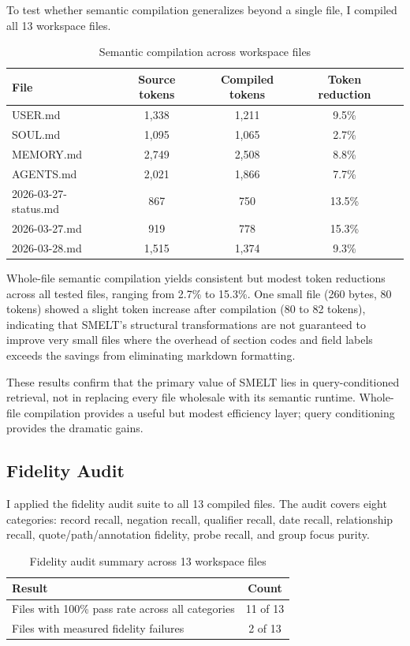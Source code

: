 \documentclass[11pt,a4paper]{article}
\begin{document}
To test whether semantic compilation generalizes beyond a single file, I compiled all 13 workspace files.

\begin{table}[H]
\centering
\caption{Semantic compilation across workspace files}
\begin{tabular}{lcccc}
\toprule
\textbf{File} & \textbf{Source tokens} & \textbf{Compiled tokens} & \textbf{Token reduction} \\
\midrule
USER.md & 1,338 & 1,211 & 9.5\% \\
SOUL.md & 1,095 & 1,065 & 2.7\% \\
MEMORY.md & 2,749 & 2,508 & 8.8\% \\
AGENTS.md & 2,021 & 1,866 & 7.7\% \\
2026-03-27-status.md & 867 & 750 & 13.5\% \\
2026-03-27.md & 919 & 778 & 15.3\% \\
2026-03-28.md & 1,515 & 1,374 & 9.3\% \\
\bottomrule
\end{tabular}
\end{table}

Whole-file semantic compilation yields consistent but modest token reductions across all tested files, ranging from 2.7\% to 15.3\%. One small file (260 bytes, 80 tokens) showed a slight token increase after compilation (80 to 82 tokens), indicating that SMELT's structural transformations are not guaranteed to improve very small files where the overhead of section codes and field labels exceeds the savings from eliminating markdown formatting.

These results confirm that the primary value of SMELT lies in query-conditioned retrieval, not in replacing every file wholesale with its semantic runtime. Whole-file compilation provides a useful but modest efficiency layer; query conditioning provides the dramatic gains.

\subsection{Fidelity Audit}

I applied the fidelity audit suite to all 13 compiled files. The audit covers eight categories: record recall, negation recall, qualifier recall, date recall, relationship recall, quote/path/annotation fidelity, probe recall, and group focus purity.

\begin{table}[H]
\centering
\caption{Fidelity audit summary across 13 workspace files}
\begin{tabular}{lc}
\toprule
\textbf{Result} & \textbf{Count} \\
\midrule
Files with 100\% pass rate across all categories & 11 of 13 \\
Files with measured fidelity failures & 2 of 13 \\
\bottomrule
\end{tabular}
\end{table}
\end{document}
